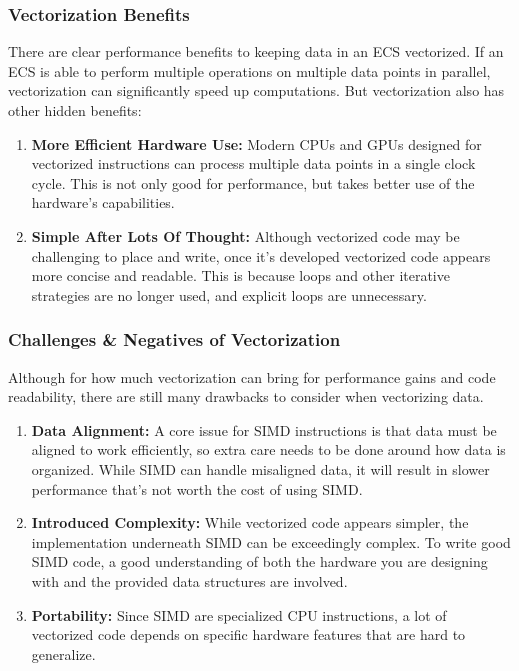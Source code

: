 \subsubsection{Vectorization Benefits}
There are clear performance benefits to keeping data in an ECS vectorized. If an ECS is able to perform multiple operations on multiple data points in parallel, vectorization can significantly speed up computations. But vectorization also has other hidden benefits:
\begin{enumerate}
    \item \textbf{More Efficient Hardware Use:} Modern CPUs and GPUs designed for vectorized instructions can process multiple data points in a single clock cycle. This is not only good for performance, but takes better use of the hardware's capabilities.
    \item \textbf{Simple After Lots Of Thought:} Although vectorized code may be challenging to place and write, once it's developed vectorized code appears more concise and readable. This is because loops and other iterative strategies are no longer used, and explicit loops are unnecessary.
\end{enumerate}

\subsubsection{Challenges \& Negatives of Vectorization}
Although for how much vectorization can bring for performance gains and code readability, there are still many drawbacks to consider when vectorizing data.
\begin{enumerate}
    \item \textbf{Data Alignment:} A core issue for SIMD instructions is that data must be aligned to work efficiently, so extra care needs to be done around how data is organized. While SIMD can handle misaligned data, it will result in slower performance that's not worth the cost of using SIMD.
    \item \textbf{Introduced Complexity:} While vectorized code appears simpler, the implementation underneath SIMD can be exceedingly complex. To write good SIMD code, a good understanding of both the hardware you are designing with and the provided data structures are involved.
    \item \textbf{Portability:} Since SIMD are specialized CPU instructions, a lot of vectorized code depends on specific hardware features that are hard to generalize. 
\end{enumerate}

